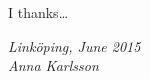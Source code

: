 \begin{acknowledgments}
  I thanks\dots

  \addvspace{1em}
  \begin{flushright}
    \textit{%
      Linköping, June 2015\\
      Anna Karlsson%
    }
  \end{flushright}
\end{acknowledgments}
